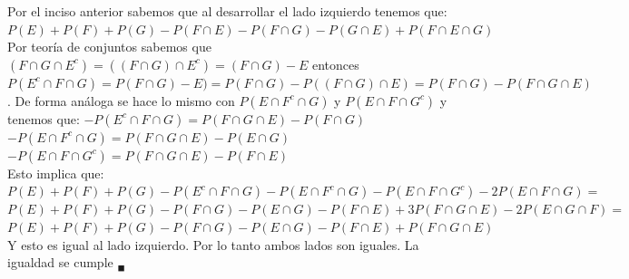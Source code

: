 \documentclass[12pt,a4paper]{report}
\begin{document}
\begin{enumerate}
{\begin{center}
	\end{center}
	Por el inciso anterior sabemos que al desarrollar el lado izquierdo tenemos que:\\
	$P(E)+P(F)+P(G)-P(F\cap E)-P(F\cap G) -P( G\cap E)+P(F\cap E \cap G)$\\
	Por teoría de conjuntos sabemos que $(F\cap G \cap E^c) = ((F \cap G) \cap E^c)=(F\cap G)-E$ entonces $P(E^c\cap F \cap G) = P(F\cap G) - E) = P(F\cap G) -P((F\cap G) \cap E)= P(F\cap G)-P(F\cap G \cap E)$. De forma análoga se hace lo mismo con $P(E\cap F^c \cap G) $ y $P(E \cap F \cap G^c)$ y tenemos que:
	$-P(E^c \cap F \cap G) = P(F\cap G \cap E) - P(F\cap G)$\\
	$-P(E \cap F^c \cap G) = P(F\cap G \cap E) - P(E\cap G)$\\
	$-P(E \cap F \cap G^c) = P(F\cap G \cap E) - P(F\cap E)$\\
	Esto implica que:\\
	$P(E)+P(F)+P(G)-P(E^c \cap F \cap G)-P(E \cap F^c \cap G)-P(E \cap F \cap G^c)-2P(E\cap F \cap G)=$\\
	$P(E)+P(F)+P(G)-P(F\cap G)-P(E\cap G)-P(F\cap E) +3P(F\cap G \cap E) -2P(E\cap G \cap F)=$\\
	$P(E)+P(F)+P(G)-P(F\cap G) - P(E \cap G) - P(F \cap E) +P(F\cap G \cap E)$\\ 
	Y esto es igual al lado izquierdo. Por lo tanto ambos lados son iguales. La igualdad se cumple $_{\blacksquare}$
	
	}


\end{enumerate}
\end{document}
